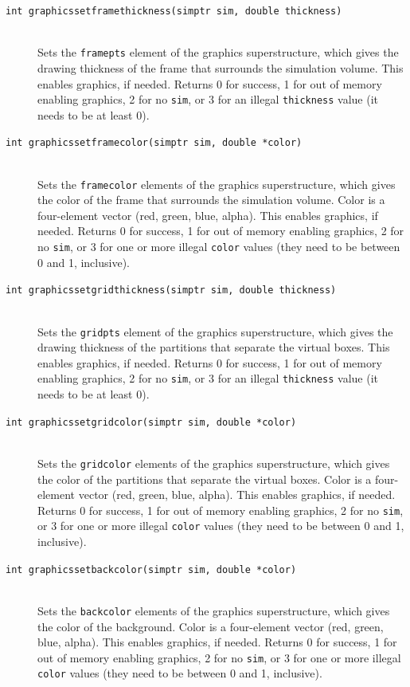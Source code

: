 \documentclass {scrbook}
\newcommand {\ttt} {\texttt}
\begin{document}
\begin{description}
\item[\ttt{int graphicssetframethickness(simptr sim, double thickness)}]
\hfill \\
Sets the \ttt{framepts} element of the graphics superstructure, which gives the drawing thickness of the frame that surrounds the simulation volume. This enables graphics, if needed. Returns 0 for success, 1 for out of memory enabling graphics, 2 for no \ttt{sim}, or 3 for an illegal \ttt{thickness} value (it needs to be at least 0).

\item[\ttt{int graphicssetframecolor(simptr sim, double *color)}]
\hfill \\
Sets the \ttt{framecolor} elements of the graphics superstructure, which gives the color of the frame that surrounds the simulation volume. Color is a four-element vector (red, green, blue, alpha). This enables graphics, if needed. Returns 0 for success, 1 for out of memory enabling graphics, 2 for no \ttt{sim}, or 3 for one or more illegal \ttt{color} values (they need to be between 0 and 1, inclusive).

\item[\ttt{int graphicssetgridthickness(simptr sim, double thickness)}]
\hfill \\
Sets the \ttt{gridpts} element of the graphics superstructure, which gives the drawing thickness of the partitions that separate the virtual boxes. This enables graphics, if needed. Returns 0 for success, 1 for out of memory enabling graphics, 2 for no \ttt{sim}, or 3 for an illegal \ttt{thickness} value (it needs to be at least 0).

\item[\ttt{int graphicssetgridcolor(simptr sim, double *color)}]
\hfill \\
Sets the \ttt{gridcolor} elements of the graphics superstructure, which gives the color of the partitions that separate the virtual boxes. Color is a four-element vector (red, green, blue, alpha). This enables graphics, if needed. Returns 0 for success, 1 for out of memory enabling graphics, 2 for no \ttt{sim}, or 3 for one or more illegal \ttt{color} values (they need to be between 0 and 1, inclusive).

\item[\ttt{int graphicssetbackcolor(simptr sim, double *color)}]
\hfill \\
Sets the \ttt{backcolor} elements of the graphics superstructure, which gives the color of the background. Color is a four-element vector (red, green, blue, alpha). This enables graphics, if needed. Returns 0 for success, 1 for out of memory enabling graphics, 2 for no \ttt{sim}, or 3 for one or more illegal \ttt{color} values (they need to be between 0 and 1, inclusive).


\end{description}
\end{document}
